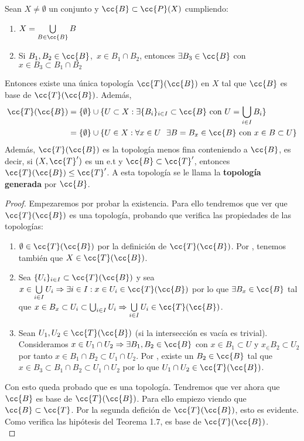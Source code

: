 \begin{teo}\label{teorema1_7}
    Sean $X\neq \emptyset$ un conjunto y $\cc{B}\subset \cc{P}(X)$ cumpliendo:
    \begin{enumerate}
        \item[\apuntar{B1}] $X=\bigcup\limits_{B\in \cc{B}}B$
        \item[\apuntar{B2}] Si $B_1,B_2\in \cc{B}$,\ $x\in B_1\cap B_2$, entonces $\exists B_3 \in \cc{B}$ con $x\in B_3 \subset B_1 \cap B_2$
    \end{enumerate}
    Entonces existe una única topología $\cc{T}(\cc{B})$ en $X$ tal que $\cc{B}$ es base de $\cc{T}(\cc{B})$. Además,
    \begin{align*}
        \cc{T}(\cc{B})&=\{\emptyset\}\cup\{U\subset X : \exists \{B_i\}_{i\in I}\subset \cc{B} \text{ con } U = \bigcup\limits_{i\in I}B_i\}\\
        &=\{\emptyset\}\cup \{U\in X:\forall x\in U\ \ \exists B=B_x\in \cc{B} \text{ con } x\in B\subset U \}
    \end{align*}
    Además, $\cc{T}(\cc{B})$ es la topología menos fina conteniendo a $\cc{B}$, es decir, si $(X,\cc{T}')$ es un e.t y $\cc{B}\subset \cc{T}'$, entonces $\cc{T}(\cc{B})\leq \cc{T}'$. A esta topología se le llama la \textbf{topología generada} por $\cc{B}$.

    \begin{proof}
        Empezaremos por probar la existencia. Para ello tendremos que ver que $\cc{T}(\cc{B})$ es una topología, probando que verifica las propiedades de las topologías:
        \begin{enumerate}[label=(A\arabic*)]
            \item $\emptyset\in \cc{T}(\cc{B})$ por la definición de $\cc{T}(\cc{B})$. Por , tenemos también que $X\in \cc{T}(\cc{B})$.
            \item Sea $\{U_i\}_{i\in I}\subset \cc{T}(\cc{B})$ y sea $x\in \bigcup\limits_{i\in I}U_i\Rightarrow \exists i \in I : x\in U_i\in \cc{T}(\cc{B})$ por lo que $\exists B_x\in \cc{B}$ tal que $x \in B_x \subset U_i\subset \bigcup_{i\in I}U_i\Rightarrow \bigcup\limits_{i\in I}U_i \in \cc{T}(\cc{B})$.
            \item Sean $U_1, U_2 \in \cc{T}(\cc{B})$ (si la intersección es vacía es trivial). Consideramos $x\in U_1\cap U_2\Rightarrow \exists B_1, B_2 \in \cc{B}$ con $x \in B_1 \subset U$ y $x_\in B_2\subset U_2$ por tanto $x\in B_1 \cap B_2 \subset U_1 \cap U_2$. Por , existe un $B_2\in \cc{B}$ tal que $x\in B_3 \subset B_1\cap B_2 \subset U_1 \cap U_2$ por lo que $U_1\cap U_2\in \cc{T}(\cc{B})$.
        \end{enumerate}
        Con esto queda probado que es una topología. Tendremos que ver ahora que $\cc{B}$ es base de $\cc{T}(\cc{B})$. Para ello empiezo viendo que $\cc{B}\subset \cc{T}$. Por la segunda defición de $\cc{T}(\cc{B})$, esto es evidente. Como verifica las hipótesis del Teorema 1.7, es base de $\cc{T}(\cc{B})$.\\


\end{proof}
\end{teo}
